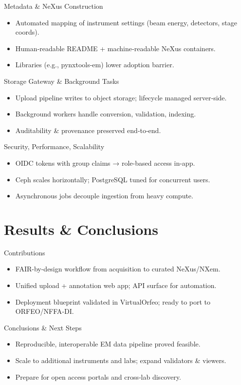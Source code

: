 \documentclass[aspectratio=169]{beamer}
\begin{document}
\begin{frame}{Metadata \& NeXus Construction}
\begin{itemize}
\item Automated mapping of instrument settings (beam energy, detectors, stage coords).
\item Human‑readable README + machine‑readable NeXus containers.
\item Libraries (e.g., pynxtools-em) lower adoption barrier.
\end{itemize}
\end{frame}

\begin{frame}{Storage Gateway \& Background Tasks}
\begin{itemize}
\item Upload pipeline writes to object storage; lifecycle managed server‑side.
\item Background workers handle conversion, validation, indexing.
\item Auditability \& provenance preserved end‑to‑end.
\end{itemize}
\end{frame}

\begin{frame}{Security, Performance, Scalability}
\begin{itemize}
\item OIDC tokens with group claims → role-based access in-app.
\item Ceph scales horizontally; PostgreSQL tuned for concurrent users.
\item Asynchronous jobs decouple ingestion from heavy compute.
\end{itemize}
\end{frame}

\section{Results \& Conclusions}
\begin{frame}{Contributions}
\begin{itemize}
\item FAIR-by-design workflow from acquisition to curated NeXus/NXem.
\item Unified upload + annotation web app; API surface for automation.
\item Deployment blueprint validated in VirtualOrfeo; ready to port to ORFEO/NFFA‑DI.
\end{itemize}
\end{frame}

\begin{frame}{Conclusions \& Next Steps}
\begin{itemize}
\item Reproducible, interoperable EM data pipeline proved feasible.
\item Scale to additional instruments and labs; expand validators \& viewers.
\item Prepare for open access portals and cross‑lab discovery.
\end{itemize}
\end{frame}
\end{document}

